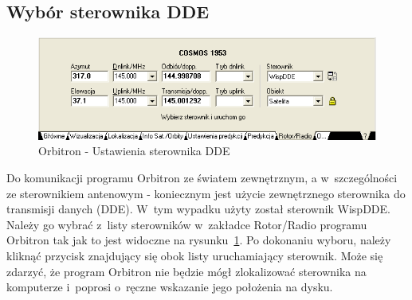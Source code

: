 \documentclass[eng,oneside]{mgr}
\begin{document}
			\subsection{Wybór sterownika DDE}				
			\begin{figure}[!htb]
				\begin{center}
					\includegraphics[scale=0.7]{screen2}
				\end{center}
				\caption{Orbitron - Ustawienia sterownika DDE}
				\label{fig:DDE_settings}
			\end{figure}
			Do komunikacji programu Orbitron ze światem zewnętrznym, a w~szczególności ze sterownikiem antenowym - koniecznym jest użycie zewnętrznego sterownika do transmisji danych (DDE). W~tym wypadku użyty został sterownik WispDDE. Należy go wybrać z~listy sterowników w~zakładce Rotor/Radio programu Orbitron tak jak to jest widoczne na rysunku~\ref{fig:DDE_settings}. Po dokonaniu wyboru, należy kliknąć przycisk znajdujący się obok listy uruchamiający sterownik. Może się zdarzyć, że program Orbitron nie będzie mógł zlokalizować sterownika na komputerze i~poprosi o~ręczne wskazanie jego położenia na dysku.
		
\end{document}
